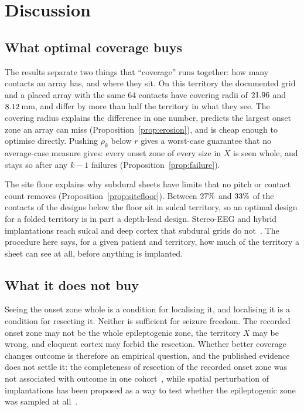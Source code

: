 \documentclass[11pt]{amsart}
\theoremstyle{definition}
\theoremstyle{remark}
\begin{document}
\section{Discussion}\label{sec:discussion}

\subsection*{What optimal coverage buys}
The results separate two things that ``coverage'' runs together: how many
contacts an array has, and where they sit. On this territory the documented
grid and a placed array with the same 64 contacts have covering radii of
$21.96$ and $8.12$\,mm, and differ by more than half
the territory in what they see. The covering radius explains the difference in
one number, predicts the largest onset zone an array can miss
(Proposition~\ref{prop:erosion}), and is cheap enough to optimise directly.
Pushing $\rho_k$ below $r$ gives a worst-case guarantee that no average-case
measure gives: every onset zone of every size in $X$ is seen whole, and stays
so after any $k-1$ failures (Proposition~\ref{prop:failure}).

The site floor explains why subdural sheets have limits that no pitch or
contact count removes (Proposition~\ref{prop:sitefloor}). Between
$27\%$ and $33\%$ of the contacts of the designs
below the floor sit in sulcal territory, so an optimal design for a folded
territory is in part a depth-lead design. Stereo-EEG and hybrid implantations
reach sulcal and deep cortex that subdural grids do
not~\cite{Jayakar2016,ParviziKastner2018}. The procedure here says, for a given
patient and territory, how much of the territory a sheet can see at all,
before anything is implanted.

\subsection*{What it does not buy}
Seeing the onset zone whole is a condition for localising it, and localising it
is a condition for resecting it. Neither is sufficient for seizure freedom.
The recorded onset zone may not be the whole epileptogenic zone, the territory
$X$ may be wrong, and eloquent cortex may forbid the resection. Whether better
coverage changes outcome is therefore an empirical question, and the published
evidence does not settle it: the completeness of resection of the recorded
onset zone was not associated with outcome in one cohort~\cite{Gascoigne2024},
while spatial perturbation of implantations has been proposed as a way to test
whether the epileptogenic zone was sampled at all~\cite{Jaber2024}.
\end{document}
